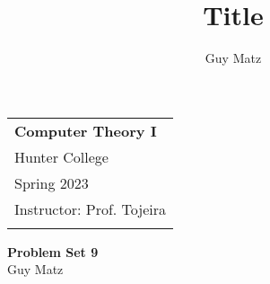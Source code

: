 \documentclass{scrbook}
\author{Guy Matz}
\begin{document}
	
	
\title{Title}

% 
% 
%
%
%
%
%


\setlength{\parindent}{0pt} %
\onehalfspacing        %


\begin{tabular}{p{15.5cm}}
    {\large \textbf{Computer Theory I}} \\
  Hunter College \\
  Spring 2023  \\
  Instructor: Prof. Tojeira\\
  \hline
  \\
\end{tabular}

\vspace*{0.3cm}        %


\begin{center}
  {\Large \textbf{Problem Set 9}}
  \vspace{2mm}\\
  Guy Matz
\end{center}
\end{document}
